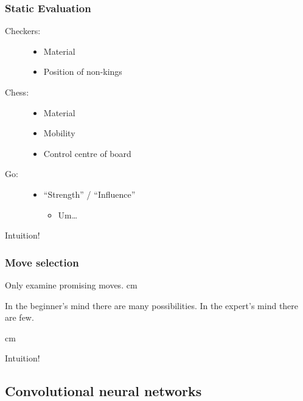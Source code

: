 \documentclass{beamer}
\begin{document}
\begin{frame}
  \frametitle{Static Evaluation}
  \begin{description}
  \item[Checkers:]\hfill
    \begin{itemize}
    \item Material
    \item Position of non-kings
    \end{itemize}
  \item[Chess:]\hfill
    \begin{itemize}
    \item Material
    \item Mobility
    \item Control centre of board
    \end{itemize}
  \item[Go:]\hfill
    \begin{itemize}
    \item ``Strength'' / ``Influence''
      \begin{itemize}
      \item Um\dots
      \end{itemize}
    \end{itemize}
  \end{description}
  \begin{tcolorbox}
    \begin{center}
      Intuition!
    \end{center}
  \end{tcolorbox}
\end{frame}

\begin{frame}
  \frametitle{Move selection}
  Only examine promising moves.
   cm
  \begin{tcolorbox}
    In the beginner's mind there are many possibilities. In the expert's mind there are few.
  \end{tcolorbox}
   cm
  \begin{tcolorbox}
    \begin{center}
      Intuition!
    \end{center}
  \end{tcolorbox}
\end{frame}


\subsection{Convolutional neural networks}
\end{document}
